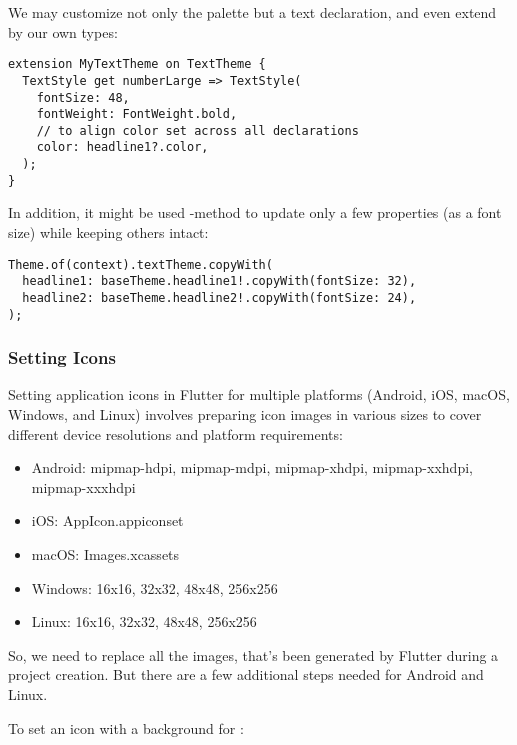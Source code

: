 We may customize not only the palette but a text declaration, and even extend  by our own types:

\begin{lstlisting}
extension MyTextTheme on TextTheme {
  TextStyle get numberLarge => TextStyle(
    fontSize: 48,
    fontWeight: FontWeight.bold,
    // to align color set across all declarations
    color: headline1?.color,
  );
}
\end{lstlisting}

\noindent In addition, it might be used -method to update only a few properties (as a font size) while 
keeping others intact: 

\begin{lstlisting}
Theme.of(context).textTheme.copyWith(
  headline1: baseTheme.headline1!.copyWith(fontSize: 32),
  headline2: baseTheme.headline2!.copyWith(fontSize: 24),
);
\end{lstlisting}


\subsubsection{Setting Icons}

Setting application icons in Flutter for multiple platforms (Android, iOS, macOS, Windows, and Linux) involves 
preparing icon images in various sizes to cover different device resolutions and platform requirements:

\begin{itemize}
  \item Android: mipmap-hdpi, mipmap-mdpi, mipmap-xhdpi, mipmap-xxhdpi, mipmap-xxxhdpi
  \item iOS: AppIcon.appiconset
  \item macOS: Images.xcassets
  \item Windows: 16x16, 32x32, 48x48, 256x256
  \item Linux: 16x16, 32x32, 48x48, 256x256
\end{itemize}

\noindent So, we need to replace all the images, that's been generated by Flutter during a project creation. But there 
are a few additional steps needed for Android and Linux.

To set an icon with a background for :

